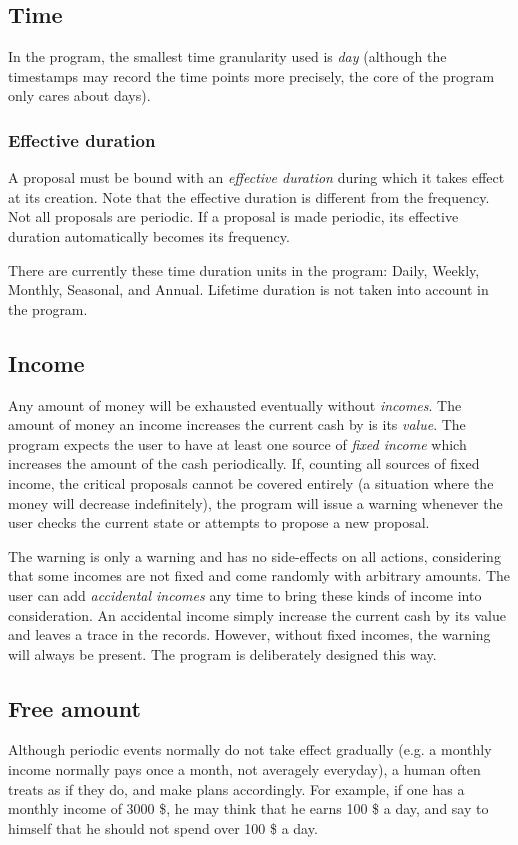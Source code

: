 \subsection{Time} \label{subsec:key.con:time}
In the program, the smallest time granularity used is \emph{day} (although the timestamps may record the time points more precisely, the core of the program only cares about days).

\subsubsection{Effective duration}
A proposal must be bound with an \emph{effective duration} during which it takes effect at its creation. Note that the effective duration is different from the frequency. Not all proposals are periodic. If a proposal is made periodic, its effective duration automatically becomes its frequency.

There are currently these time duration units in the program: Daily, Weekly, Monthly, Seasonal, and Annual. Lifetime duration is not taken into account in the program.

\subsection{Income}
Any amount of money will be exhausted eventually without \emph{incomes}. The amount of money an income increases the current cash by is its \emph{value}. The program expects the user to have at least one source of \emph{fixed income} which increases the amount of the cash periodically. If, counting all sources of fixed income, the critical proposals cannot be covered entirely (a situation where the money will decrease indefinitely), the program will issue a warning whenever the user checks the current state or attempts to propose a new proposal.

The warning is only a warning and has no side-effects on all actions, considering that some incomes are not fixed and come randomly with arbitrary amounts. The user can add \emph{accidental incomes} any time to bring these kinds of income into consideration. An accidental income simply increase the current cash by its value and leaves a trace in the records. However, without fixed incomes, the warning will always be present. The program is deliberately designed this way.

\subsection{Free amount}
Although periodic events normally do not take effect gradually (e.g. a monthly income normally pays once a month, not averagely everyday), a human often treats as if they do, and make plans accordingly. For example, if one has a monthly income of 3000 \$, he may think that he earns 100 \$ a day, and say to himself that he should not spend over 100 \$ a day.

